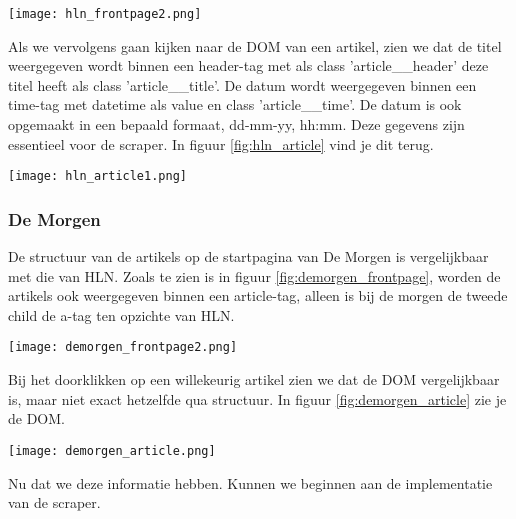 \begin{center}
    \texttt{[image: hln\_frontpage2.png]}
    \label{fig:hln_frontpage}
\end{center}

Als we vervolgens gaan kijken naar de DOM van een artikel, zien we dat de titel weergegeven wordt binnen een header-tag met als class 'article\_\_header' deze titel heeft als class 'article\_\_title'. De datum wordt weergegeven binnen een time-tag met datetime als value en class 'article\_\_time'. De datum is ook opgemaakt in een bepaald formaat, dd-mm-yy, hh:mm. Deze gegevens zijn essentieel voor de scraper. In figuur \ref{fig:hln_article} vind je dit terug. \\

\begin{center}
    \texttt{[image: hln\_article1.png]}
    \label{fig:hln_article}
\end{center}

\subsubsection{De Morgen}
De structuur van de artikels op de startpagina van De Morgen is vergelijkbaar met die van HLN. Zoals te zien is in figuur \ref{fig:demorgen_frontpage}, worden de artikels ook weergegeven binnen een article-tag, alleen is bij de morgen de tweede child de a-tag ten opzichte van HLN.

\begin{center}
    \texttt{[image: demorgen\_frontpage2.png]}
    \label{fig:demorgen_frontpage}
\end{center}

Bij het doorklikken op een willekeurig artikel zien we dat de DOM vergelijkbaar is, maar niet exact hetzelfde qua structuur. In figuur \ref{fig:demorgen_article} zie je de DOM.

\begin{center}
    \texttt{[image: demorgen\_article.png]}
    \label{fig:demorgen_article} 
\end{center}

Nu dat we deze informatie hebben. Kunnen we beginnen aan de implementatie van de scraper. 


